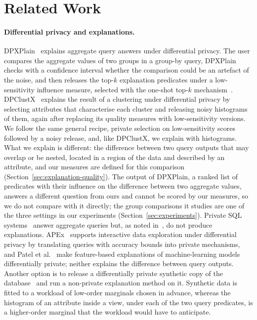 \section{Related Work}
\label{sec:related}
\paragraph{Differential privacy and explanations.}
DPXPlain~\cite{TaoGMR22} explains aggregate query answers under differential privacy.
The user compares the aggregate values of two groups in a group-by query, DPXPlain checks with a confidence interval whether the comparison could be an artefact of the noise, and then releases the top-$k$ explanation predicates under a low-sensitivity influence measure, selected with the one-shot top-$k$ mechanism~\cite{DurfeeRogers19}.
DPClustX~\cite{DPClustX} explains the result of a clustering under differential privacy by selecting attributes that characterise each cluster and releasing noisy histograms of them, again after replacing its quality measures with low-sensitivity versions.
We follow the same general recipe, private selection on low-sensitivity scores followed by a noisy release, and, like DPClustX, we explain with histograms.
What we explain is different: the difference between two query outputs that may overlap or be nested, located in a region of the data and described by an attribute, and our measures are defined for this comparison (Section~\ref{sec:explanation-quality}).
The output of DPXPlain, a ranked list of predicates with their influence on the difference between two aggregate values, answers a different question from ours and cannot be scored by our measures, so we do not compare with it directly; the group comparisons it studies are one of the three settings in our experiments (Section~\ref{sec:experiments}).
Private SQL systems~\cite{mcsherry2009,JNS18,JNHS20} answer aggregate queries but, as noted in~\cite{TaoGMR22}, do not produce explanations.
APEx~\cite{GeHIM19} supports interactive data exploration under differential privacy by translating queries with accuracy bounds into private mechanisms, and Patel et al.~\cite{PatelSZ22} make feature-based explanations of machine-learning models differentially private; neither explains the difference between query outputs.
Another option is to release a differentially private synthetic copy of the database~\cite{McKennaMSM22} and run a non-private explanation method on it.
Synthetic data is fitted to a workload of low-order marginals chosen in advance, whereas the histogram of an attribute inside a view, under each of the two query predicates, is a higher-order marginal that the workload would have to anticipate.

